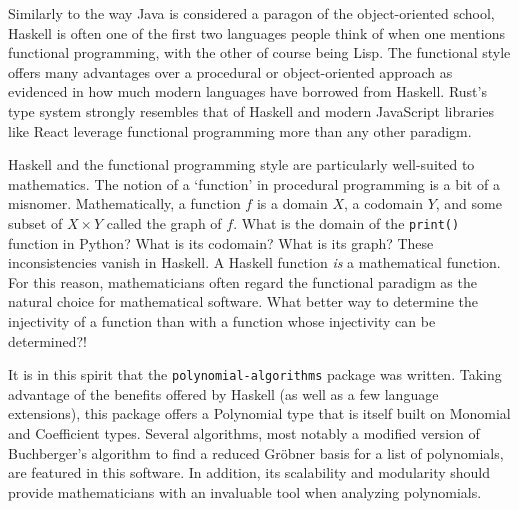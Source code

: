 \documentclass[MS, xcolor=dvipsnames]{wfuthesis}
\theoremstyle{definition}
\begin{document}
Similarly to the way Java is considered a paragon of the object-oriented school, Haskell is often one of the first two languages people think of when one mentions functional programming, with the other of course being Lisp. The functional style offers many advantages over a procedural or object-oriented approach as evidenced in how much modern languages have borrowed from Haskell. Rust's type system strongly resembles that of Haskell \cite{Poss2014} and modern JavaScript libraries like React  leverage functional programming more than any other paradigm. \par 
Haskell and the functional programming style are particularly well-suited to mathematics. The notion of a `function' in procedural programming is a bit of a misnomer. Mathematically, a function $f$ is a domain $X$, a codomain $Y$, and some subset of $X \times Y$ called the graph of $f$. What is the domain of the \lstinline{print()} function in Python? What is its codomain? What is its graph? These inconsistencies vanish in Haskell. A Haskell function \textit{is} a mathematical function. For this reason, mathematicians often regard the functional paradigm as the natural choice for mathematical software. What better way to determine the injectivity of a function than with a function whose injectivity can be determined?! \par 
It is in this spirit that the \lstinline{polynomial-algorithms} package was written. Taking advantage of the benefits offered by Haskell (as well as a few language extensions), this package offers a Polynomial type that is itself built on Monomial and Coefficient types. Several algorithms, most notably a modified version of Buchberger's algorithm to find a reduced Gr\"obner basis for a list of polynomials, are featured in this software. In addition, its scalability and modularity should provide mathematicians with an invaluable tool when analyzing polynomials. %
\end{document}
